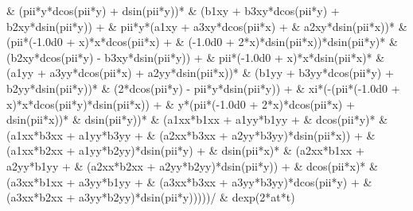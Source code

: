 \begin{fortrancode}[caption={Termos fontes}, label={cod:fortran-diffeq_2}]
     &     (pii*y*dcos(pii*y) + dsin(pii*y))*
     &     (b1xy + b3xy*dcos(pii*y) + b2xy*dsin(pii*y)) + 
     &    pii*y*(a1xy + a3xy*dcos(pii*x) + 
     &       a2xy*dsin(pii*x))*
     &     (pii*(-1.0d0 + x)*x*dcos(pii*x) + 
     &       (-1.0d0 + 2*x)*dsin(pii*x))*dsin(pii*y)*
     &     (b2xy*dcos(pii*y) - b3xy*dsin(pii*y)) + 
     &    pii*(-1.0d0 + x)*x*dsin(pii*x)*
     &     (a1yy + a3yy*dcos(pii*x) + a2yy*dsin(pii*x))*
     &     (b1yy + b3yy*dcos(pii*y) + b2yy*dsin(pii*y))*
     &     (2*dcos(pii*y) - pii*y*dsin(pii*y)) + 
     &    xi*(-(pii*(-1.0d0 + x)*x*dcos(pii*y)*dsin(pii*x)) + 
     &       y*(pii*(-1.0d0 + 2*x)*dcos(pii*x) + dsin(pii*x))*
     &        dsin(pii*y))*
     &     (a1xx*b1xx + a1yy*b1yy + 
     &       dcos(pii*y)*
     &        (a1xx*b3xx + a1yy*b3yy + 
     &          (a2xx*b3xx + a2yy*b3yy)*dsin(pii*x)) + 
     &       (a1xx*b2xx + a1yy*b2yy)*dsin(pii*y) + 
     &       dsin(pii*x)*
     &        (a2xx*b1xx + a2yy*b1yy + 
     &          (a2xx*b2xx + a2yy*b2yy)*dsin(pii*y)) + 
     &       dcos(pii*x)*
     &        (a3xx*b1xx + a3yy*b1yy + 
     &          (a3xx*b3xx + a3yy*b3yy)*dcos(pii*y) + 
     &          (a3xx*b2xx + a3yy*b2yy)*dsin(pii*y)))))/
     &  dexp(2*at*t)
     

\end{fortrancode}
